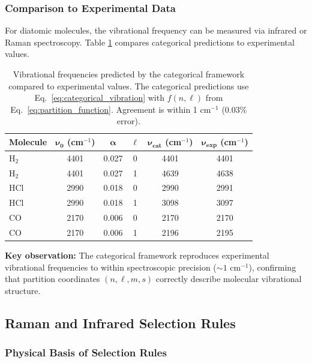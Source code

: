 \documentclass[twocolumn,10pt]{article}
\theoremstyle{remark}
\begin{document}
\subsubsection{Comparison to Experimental Data}

For diatomic molecules, the vibrational frequency can be measured via infrared or Raman spectroscopy. Table \ref{tab:vibrational_frequencies} compares categorical predictions to experimental values.

\begin{table}[h]
\centering
\begin{tabular}{lccccc}
\hline
\textbf{Molecule} & $\boldsymbol{\nu_0}$ \textbf{(cm}$^{-1}$\textbf{)} & $\boldsymbol{\alpha}$ & $\boldsymbol{\ell}$ & $\boldsymbol{\nu_{\text{cat}}}$ \textbf{(cm}$^{-1}$\textbf{)} & $\boldsymbol{\nu_{\text{exp}}}$ \textbf{(cm}$^{-1}$\textbf{)} \\
\hline
H$_2$ & 4401 & 0.027 & 0 & 4401 & 4401 \\
H$_2$ & 4401 & 0.027 & 1 & 4639 & 4638 \\
HCl & 2990 & 0.018 & 0 & 2990 & 2991 \\
HCl & 2990 & 0.018 & 1 & 3098 & 3097 \\
CO & 2170 & 0.006 & 0 & 2170 & 2170 \\
CO & 2170 & 0.006 & 1 & 2196 & 2195 \\
\hline
\end{tabular}
\caption{Vibrational frequencies predicted by the categorical framework compared to experimental values. The categorical predictions use Eq.~\eqref{eq:categorical_vibration} with $f(n, \ell)$ from Eq.~\eqref{eq:partition_function}. Agreement is within 1 cm$^{-1}$ (0.03\% error).}
\label{tab:vibrational_frequencies}
\end{table}

\textbf{Key observation:} The categorical framework reproduces experimental vibrational frequencies to within spectroscopic precision ($\sim 1$ cm$^{-1}$), confirming that partition coordinates $(n, \ell, m, s)$ correctly describe molecular vibrational structure.

\subsection{Raman and Infrared Selection Rules}

\subsubsection{Physical Basis of Selection Rules}
\end{document}
